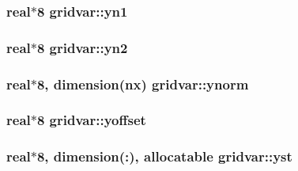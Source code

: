\subsubsection[{yn1}]{\setlength{\rightskip}{0pt plus 5cm}real$\ast$8 gridvar\+::yn1}\label{namespacegridvar_aae5cbf9885ae6ff5abebd0b9768a574d}
\hypertarget{namespacegridvar_adfe4b86cb9e6418fe49ea8441e612530}{}
\subsubsection[{yn2}]{\setlength{\rightskip}{0pt plus 5cm}real$\ast$8 gridvar\+::yn2}\label{namespacegridvar_adfe4b86cb9e6418fe49ea8441e612530}
\hypertarget{namespacegridvar_ac91a158f48b7fda45b049e434e3c1147}{}
\subsubsection[{ynorm}]{\setlength{\rightskip}{0pt plus 5cm}real$\ast$8, dimension({\bf nx}) gridvar\+::ynorm}\label{namespacegridvar_ac91a158f48b7fda45b049e434e3c1147}
\hypertarget{namespacegridvar_af659082800429edb283c62f245146f28}{}
\subsubsection[{yoffset}]{\setlength{\rightskip}{0pt plus 5cm}real$\ast$8 gridvar\+::yoffset}\label{namespacegridvar_af659082800429edb283c62f245146f28}
\hypertarget{namespacegridvar_addb37740c3b5b897fb0e5a34bfbcf08c}{}
\subsubsection[{yst}]{\setlength{\rightskip}{0pt plus 5cm}real$\ast$8, dimension(\+:), allocatable gridvar\+::yst}\label{namespacegridvar_addb37740c3b5b897fb0e5a34bfbcf08c}
